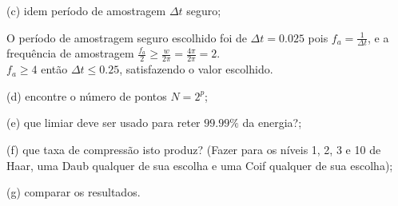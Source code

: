 \documentclass[10pt]{article}
\begin{document}
(c) idem período de amostragem $\Delta t$ seguro;

O período de amostragem seguro escolhido foi de $\Delta{t} = 0.025$ pois $f_a = \frac{1}{\Delta{t}}$,
e a frequência de amostragem $\frac{f_a}{2} \ge \frac{w}{2\pi} = \frac{4\pi}{2\pi} = 2$.\\
$f_a \ge 4$ então $\Delta{t} \le 0.25$, satisfazendo o valor escolhido.
\vspace{\baselineskip}

(d) encontre o número de pontos $N = 2^p$;

(e) que limiar deve ser usado para reter $99.99\%$ da energia?;

(f) que taxa de compressão isto produz? (Fazer para os níveis 1, 2, 3 e 10 de Haar, uma Daub qualquer de sua escolha e uma Coif qualquer de sua escolha);

(g) comparar os resultados.
\end{document}
